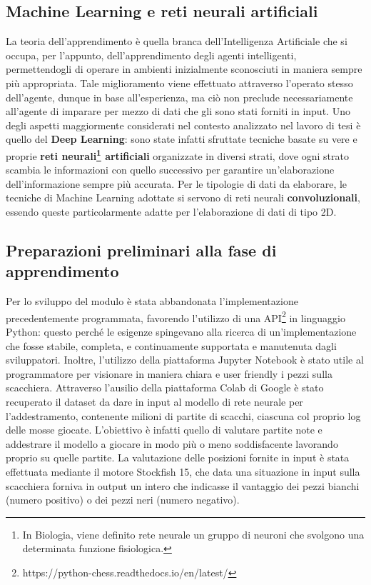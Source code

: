 \subsection{Machine Learning e reti neurali artificiali}
La teoria dell'apprendimento è quella branca dell'Intelligenza Artificiale che si occupa, per l'appunto, dell'apprendimento degli agenti intelligenti, permettendogli di operare in ambienti inizialmente sconosciuti in maniera sempre più appropriata. Tale miglioramento viene effettuato attraverso l'operato stesso dell'agente, dunque in base all'esperienza, ma ciò non preclude necessariamente all'agente di imparare per mezzo di dati che gli sono stati forniti in input.
Uno degli aspetti maggiormente considerati nel contesto analizzato nel lavoro di tesi è quello del \textbf{Deep Learning}: sono state infatti sfruttate tecniche basate su vere e proprie \textbf{reti neurali\footnote{In Biologia, viene definito rete neurale un gruppo di neuroni che svolgono una determinata funzione fisiologica.} artificiali} organizzate in diversi strati, dove ogni strato scambia le informazioni con quello successivo per garantire un'elaborazione dell'informazione sempre più accurata. Per le tipologie di dati da elaborare, le tecniche di Machine Learning adottate si servono di reti neurali \textbf{convoluzionali}, essendo queste particolarmente adatte per l'elaborazione di dati di tipo 2D.

\subsection{Preparazioni preliminari alla fase di apprendimento}
Per lo sviluppo del modulo è stata abbandonata l'implementazione precedentemente programmata, favorendo l'utilizzo di una API\footnote{https://python-chess.readthedocs.io/en/latest/} in linguaggio Python: questo perché le esigenze spingevano alla ricerca di un'implementazione che fosse stabile, completa, e continuamente supportata e manutenuta dagli sviluppatori. Inoltre, l'utilizzo della piattaforma Jupyter Notebook è stato utile al programmatore per visionare in maniera chiara e user friendly i pezzi sulla scacchiera. Attraverso l'ausilio della piattaforma Colab di Google è stato recuperato il dataset da dare in input al modello di rete neurale per l'addestramento, contenente milioni di partite di scacchi, ciascuna col proprio log delle mosse giocate. L'obiettivo è infatti quello di valutare partite note e addestrare il modello a giocare in modo più o meno soddisfacente lavorando proprio su quelle partite. La valutazione delle posizioni fornite in input è stata effettuata mediante il motore Stockfish 15, che data una situazione in input sulla scacchiera forniva in output un intero che indicasse il vantaggio dei pezzi bianchi (numero positivo) o dei pezzi neri (numero negativo). \newpage

